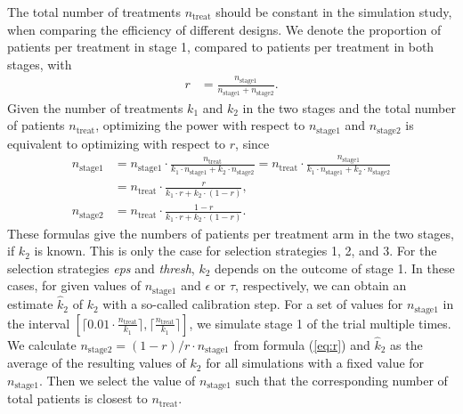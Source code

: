 \documentclass[bimj,fleqn]{w-art}
\theoremstyle{plain}
\theoremstyle{definition}
\begin{document}
The total number of treatments $n_{\text{treat}}$ should be constant in the simulation study, when comparing the efficiency of different designs.
We denote the proportion of patients per treatment in stage 1, compared to patients per treatment in both stages, with 
\begin{align}
  \label{eq:r}
 r & = \frac{n_{\text{stage1}}}{n_{\text{stage1}}+n_{\text{stage2}}}.
\end{align}
Given the number of treatments $k_1$ and $k_2$ in the two stages and the total number of patients $n_{\text{treat}}$, optimizing the power with respect to $n_{\text{stage1}}$ and $n_{\text{stage2}}$ is equivalent to optimizing with respect to $r$, since
\begin{align}
  \label{eq:stagec}
  n_{\text{stage1}} & = 
  n_{\text{stage1}}\cdot \frac{n_{\text{treat}}}{k_1\cdot n_{\text{stage1}}+k_2\cdot n_{\text{stage2}}} = 
  n_{\text{treat}} \cdot \frac{n_{\text{stage1}}}{k_1\cdot n_{\text{stage1}}+k_2\cdot n_{\text{stage2}}} \nonumber \\
  & = n_{\text{treat}}\cdot
  \frac{r}{k_1\cdot
  r+k_2\cdot (1-r)}, \nonumber \\
  n_{\text{stage2}} & =
  n_{\text{treat}}\cdot
  \frac{1-r}{k_1\cdot
  r+k_2\cdot (1-r)}.
\end{align}
These formulas give the numbers of patients per treatment arm in the two stages, if $k_2$ is known. 
This is only the case for selection strategies 1, 2, and 3.
For the selection strategies \emph{eps} and \emph{thresh}, $k_2$ depends on the outcome of stage 1.
In these cases, for given values of $n_{\text{stage1}}$ and $\epsilon$ or $\tau$, respectively, we can obtain an estimate $\hat{k}_2$ of $k_2$ with a so-called calibration step.
For a set of values for $n_{\text{stage1}}$ in the interval $\left[ \lceil 0.01 \cdot \frac{n_{\text{treat}}}{k_1} \rceil, \lceil \frac{n_{\text{treat}}}{k_1} \rceil \right]$, we simulate stage 1 of the trial multiple times.
We calculate $n_{\text{stage2}} = (1-r)/r\cdot n_{\text{stage1}}$ from formula (\ref{eq:r}) and $\hat{k}_2$ as the average of the resulting values of $k_2$ for all simulations with a fixed value for $n_{\text{stage1}}$.
Then we select the value of $n_{\text{stage1}}$ such that the corresponding number of total patients is closest to $n_{\text{treat}}$.
\end{document}

